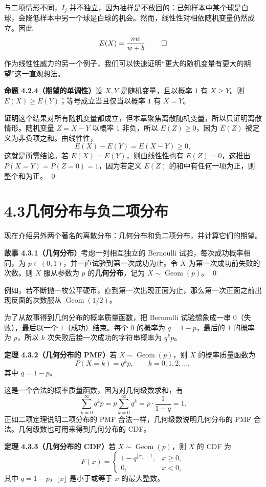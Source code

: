 \documentclass[UTF8, 12pt, fontset=fandol, oneside]{ctexart}
\begin{document}
与二项情形不同，$I_j$ 并不独立，因为抽样是不放回的：已知样本中某个球是白球，会降低样本中另一个球是白球的机会。然而，线性性对相依随机变量仍然成立。因此
\[
  E(X)=\frac{nw}{w+b}. \qed
\]

作为线性性威力的另一个例子，我们可以快速证明“更大的随机变量有更大的期望”这一直观想法。

\noindent\textbf{命题 4.2.4（期望的单调性）}\quad 设 $X,Y$ 是随机变量，且以概率 $1$ 有 $X\ge Y$。则 $E(X)\ge E(Y)$；等号成立当且仅当以概率 $1$ 有 $X=Y$。

\noindent\textbf{证明}\quad 这个结果对所有随机变量都成立，但本章聚焦离散随机变量，所以只证明离散情形。随机变量 $Z=X-Y$ 以概率 $1$ 非负，所以 $E(Z)\ge 0$，因为 $E(Z)$ 被定义为非负项之和。由线性性，
\[
  E(X)-E(Y)=E(X-Y)\ge 0,
\]
这就是所需结论。若 $E(X)=E(Y)$，则由线性性也有 $E(Z)=0$，这推出 $P(X=Y)=P(Z=0)=1$，因为若定义 $E(Z)$ 的和中有任何一项为正，则整个和为正。 \qed

\section*{4.3\quad 几何分布与负二项分布}

现在介绍另外两个著名的离散分布：几何分布和负二项分布，并计算它们的期望。

\noindent\textbf{故事 4.3.1（几何分布）}\quad 考虑一列相互独立的 Bernoulli 试验，每次成功概率相同，为 $p\in(0,1)$，并一直试验到第一次成功为止。令 $X$ 为第一次成功前失败的次数。则 $X$ 服从参数为 $p$ 的\textbf{几何分布}，记为 $X\sim\operatorname{Geom}(p)$。 \qed

例如，若不断抛一枚公平硬币，直到第一次出现正面为止，那么第一次正面之前出现反面的次数服从 $\operatorname{Geom}(1/2)$。

为了从故事得到几何分布的概率质量函数，把 Bernoulli 试验想象成一串 $0$（失败），最后以一个 $1$（成功）结束。每个 $0$ 的概率为 $q=1-p$，最后的 $1$ 的概率为 $p$，所以 $k$ 次失败后接一次成功的字符串概率为 $q^kp$。

\noindent\textbf{定理 4.3.2（几何分布的 PMF）}\quad 若 $X\sim\operatorname{Geom}(p)$，则 $X$ 的概率质量函数为
\[
  P(X=k)=q^kp,\qquad k=0,1,2,\ldots,
\]
其中 $q=1-p$。

这是一个合法的概率质量函数，因为对几何级数求和，有
\[
  \sum_{k=0}^{\infty}q^kp=p\sum_{k=0}^{\infty}q^k
  =p\cdot\frac{1}{1-q}=1.
\]
正如二项定理说明二项分布的 PMF 合法一样，几何级数说明几何分布的 PMF 合法。几何级数也可用来得到几何分布的 CDF。

\noindent\textbf{定理 4.3.3（几何分布的 CDF）}\quad 若 $X\sim\operatorname{Geom}(p)$，则 $X$ 的 CDF 为
\[
  F(x)=
  \begin{cases}
    1-q^{\lfloor x\rfloor+1}, & x\ge 0,\\
    0, & x<0,
  \end{cases}
\]
其中 $q=1-p$，$\lfloor x\rfloor$ 是小于或等于 $x$ 的最大整数。
\end{document}
